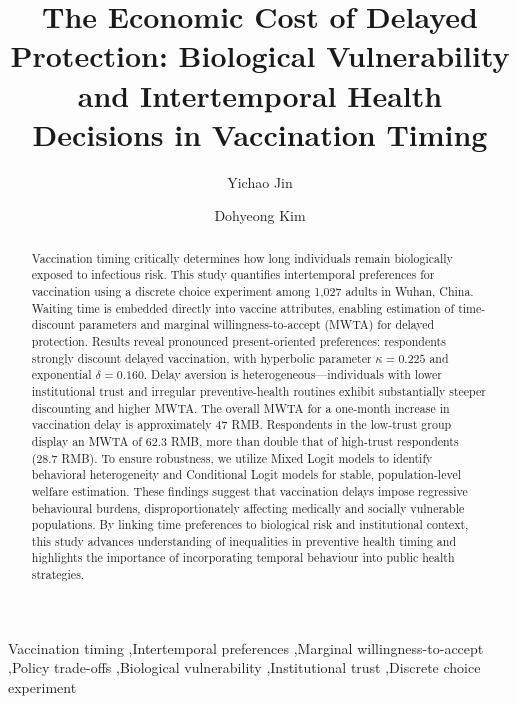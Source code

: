 \documentclass[preprint,12pt,authoryear]{elsarticle}
\begin{document}
\begin{frontmatter}

\title{The Economic Cost of Delayed Protection: Biological Vulnerability and Intertemporal Health Decisions in Vaccination Timing}

\author{Yichao Jin}
\address{University of Texas at Dallas}

\author{Dohyeong Kim}
\address{University of Texas at Dallas}

\begin{abstract}
Vaccination timing critically determines how long individuals remain biologically exposed to infectious risk. This study quantifies intertemporal preferences for vaccination using a discrete choice experiment among 1,027 adults in Wuhan, China. Waiting time is embedded directly into vaccine attributes, enabling estimation of time-discount parameters and marginal willingness-to-accept (MWTA) for delayed protection.
Results reveal pronounced present-oriented preferences: respondents strongly discount delayed vaccination, with hyperbolic parameter $\kappa = 0.225$ and exponential $\delta = 0.160$. Delay aversion is heterogeneous—individuals with lower institutional trust and irregular preventive-health routines exhibit substantially steeper discounting and higher MWTA. The overall MWTA for a one-month increase in vaccination delay is approximately 47 RMB. Respondents in the low-trust group display an MWTA of 62.3 RMB, more than double that of high-trust respondents (28.7 RMB). 
To ensure robustness, we utilize Mixed Logit models to identify behavioral heterogeneity and Conditional Logit models for stable, population-level welfare estimation. These findings suggest that vaccination delays impose regressive behavioural burdens, disproportionately affecting medically and socially vulnerable populations. By linking time preferences to biological risk and institutional context, this study advances understanding of inequalities in preventive health timing and highlights the importance of incorporating temporal behaviour into public health strategies.
\end{abstract}

\begin{keyword}
Vaccination timing \sep Intertemporal preferences \sep Marginal willingness-to-accept \sep Policy trade-offs \sep Biological vulnerability \sep Institutional trust \sep Discrete choice experiment
\end{keyword}

\end{frontmatter}
\end{document}

